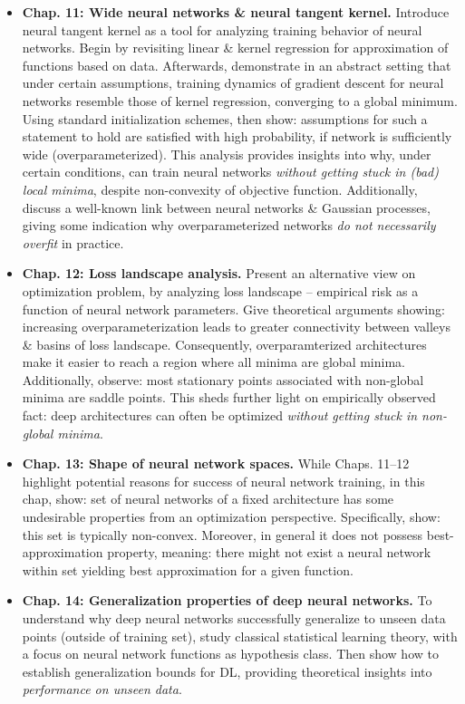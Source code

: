 \documentclass{article}
\begin{document}
\begin{enumerate}
\begin{itemize}
\begin{itemize}
\begin{itemize}
				\item {\bf Chap. 11: Wide neural networks \& neural tangent kernel.} Introduce neural tangent kernel as a tool for analyzing training behavior of neural networks. Begin by revisiting linear \& kernel regression for approximation of functions based on data. Afterwards, demonstrate in an abstract setting that under certain assumptions, training dynamics of gradient descent for neural networks resemble those of kernel regression, converging to a global minimum. Using standard initialization schemes, then show: assumptions for such a statement to hold are satisfied with high probability, if network is sufficiently wide (overparameterized). This analysis provides insights into why, under certain conditions, can train neural networks {\it without getting stuck in (bad) local minima}, despite non-convexity of objective function. Additionally, discuss a well-known link between neural networks \& Gaussian processes, giving some indication why overparameterized networks {\it do not necessarily overfit} in practice.
				\item {\bf Chap. 12: Loss landscape analysis.} Present an alternative view on optimization problem, by analyzing loss landscape -- empirical risk as a function of neural network parameters. Give theoretical arguments showing: increasing overparameterization leads to greater connectivity between valleys \& basins of loss landscape. Consequently, overparamterized architectures make it easier to reach a region where all minima are global minima. Additionally, observe: most stationary points associated with non-global minima are saddle points. This sheds further light on empirically observed fact: deep architectures can often be optimized {\it without getting stuck in non-global minima}.
				\item {\bf Chap. 13: Shape of neural network spaces.} While Chaps. 11--12 highlight potential reasons for success of neural network training, in this chap, show: set of neural networks of a fixed architecture has some undesirable properties from an optimization perspective. Specifically, show: this set is typically non-convex. Moreover, in general it does not possess best-approximation property, meaning: there might not exist a neural network within set yielding best approximation for a given function.
				\item {\bf Chap. 14: Generalization properties of deep neural networks.} To understand why deep neural networks successfully generalize to unseen data points (outside of training set), study classical statistical learning theory, with a focus on neural network functions as hypothesis class. Then show how to establish generalization bounds for DL, providing theoretical insights into {\it performance on unseen data}.

\end{itemize}
\end{itemize}
\end{itemize}
\end{enumerate}
\end{document}
